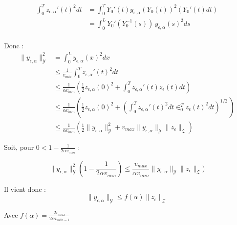 \documentclass[a4paper]{article}
\newcommand{\Y}{\mathscr{Y}}
\newcommand{\Z}{\mathscr{Z}}
\newcommand{\yea}{y_{\epsilon, \alpha}}
\newcommand{\zea}{z_{\epsilon, \alpha}}
\begin{document}
\[
\begin{split}
\int_0^T \zea'(t)^2 dt & = \int_0^T Y_0'(t)\yea(Y_0(t))^2 (Y_0'(t)dt) \\
                       & = \int_0^L Y_0'(Y_0^{-1}(s)) \, \yea(s)^2 ds\\
\end{split}
\]

Donc :
\[
\begin{split}
\| \yea \|_{\Y}^2 &= \int_0^L \yea(x)^2 dx \\
                  &\leq \displaystyle \frac{1}{v_{min}}
				      \int_0^T \zea'(t)^2 dt \\ 
				  &\leq \displaystyle \frac{1}{\alpha v_{min}}
				      (\displaystyle \frac{1}{2}\zea(0)^2 
				      + \int_0^T \zea'(t)z_{\epsilon}(t) dt)\\
					  &\leq \displaystyle \frac{1}{\alpha v_{min}}
					      (\displaystyle \frac{1}{2}\zea(0)^2 
					      + (\int_0^T \zea'(t)^2 dt \in_0^Tz_{\epsilon}(t)^2 dt)^{1/2}\,)\\
				  &\leq \displaystyle \frac{1}{\alpha v_{min}}
				      (\frac{1}{2}  \| \yea \|_{\Y}^2
				      +  v_{max} \| \yea \|_{\Y}
					  \|z_{\epsilon} \|_{\Z})
\end{split}
\]

Soit, pour $0< 1-\displaystyle \frac{1}{2\alpha v_{min}} $  :

\[
\| \yea \|_{\Y}^2 (1-\displaystyle \frac{1}{2\alpha v_{min}})
  \leq \frac{v_{max}}{\alpha v_{min}}  \| \yea \|_{\Y} \|z_{\epsilon} \|_{\Z})
\]				  

Il vient donc :
\[
\| \yea \|_{\Y}  \leq f(\alpha) \|z_{\epsilon} \|_{\Z}
\]

Avec $f(\alpha) = \displaystyle \frac{2v_{max}}{2\alpha v_{min -1}}$
	
\end{document}

